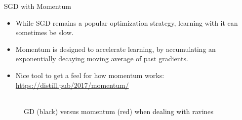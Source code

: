 \begin{vbframe}{SGD with Momentum}
\begin{itemize}
\item While SGD remains a popular optimization strategy, learning with it can sometimes be slow.
\item Momentum is designed to accelerate learning, by accumulating an exponentially decaying moving average of past gradients.
\item Nice tool to get a feel for how momentum works: \url{https://distill.pub/2017/momentum/}
\end{itemize}
\begin{figure}
\centering
{}
\\GD (black) versus momentum (red) when dealing with ravines
\end{figure}
\end{vbframe}


